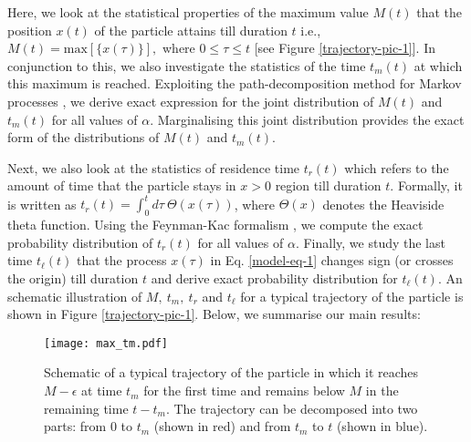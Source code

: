\documentclass[showpacs,amsmath,amssymb,aps,pre,twocolumn,]{revtex4-1}
\def\bluew#1{{\color{black} #1}}
\begin{document}
Here, we look at the statistical properties of the maximum value $M(t)$ that the position $x(t)$ of the particle attains till duration $t$ i.e., $M(t) = \text{max}[\{ x (\tau) \}],$ where $0 \leq  \tau \leq t$ [see Figure \ref{trajectory-pic-1}]. In conjunction to this, we also investigate the statistics of the time $t_m(t)$ at which this maximum is reached. Exploiting the path-decomposition method for Markov processes \bluew{\cite{tmax-2}}, we derive exact expression for the joint distribution of $M(t)$ and $t_m(t)$ for all values of $\alpha$. Marginalising this joint distribution provides the exact form of the distributions of $M(t)$ and $t_m(t)$.  

Next, we also look at the statistics of residence time $t_r(t)$ which refers to the amount of time that the particle stays in $x>0$ region till duration $t$. Formally, it is written as $t_r(t) = \int _{0}^{t} d\tau~ \Theta \left( x(\tau) \right)$, where $\Theta (x)$ denotes the Heaviside theta function. Using the Feynman-Kac formalism \bluew{\cite{Kac1,Majumdar005}}, we compute the exact probability distribution of $t_r(t)$ for all values of $\alpha$. Finally, we study the last time $t _{\ell}(t)$ that the process $x(\tau)$ in Eq. \eqref{model-eq-1} changes sign (or crosses the origin) till duration $t$ and derive exact probability distribution for  $t _{\ell}(t)$. An schematic illustration of $M,~t_m,~t_r$ and $t_{\ell}$ for a typical trajectory of the particle is shown in Figure \ref{trajectory-pic-1}.  Below, we summarise our main results:
\begin{figure}[t]
\texttt{[image: max\_tm.pdf]}
\centering
\caption{Schematic of a typical trajectory of the particle in which it reaches $M-\epsilon$ at time $t_m$ for the first time and remains below $M$ in the remaining time $t-t_m$. The trajectory can be decomposed into two parts: from $0$ to $t_m$ (shown in red) and from $t_m$ to $t$ (shown in blue).}
\label{trajectory-pic-2}
\end{figure}
\end{document}
